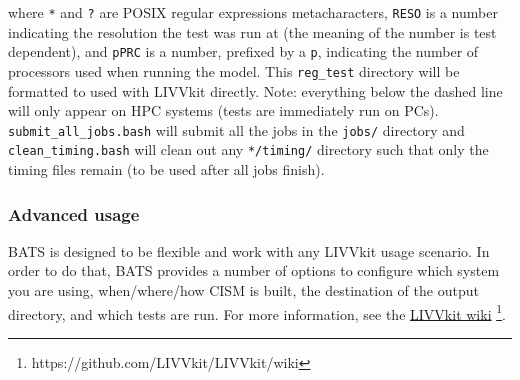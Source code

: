 \noindent
where \texttt{*} and \texttt{?} are POSIX regular expressions metacharacters, \texttt{RESO} is a number indicating the
resolution the test was run at (the meaning of the number is test dependent), and \texttt{pPRC} is a number, prefixed by
a \texttt{p}, indicating the number of processors used when running the model. This \texttt{reg\_test} directory will be
formatted to used with LIVVkit directly. Note: everything below the dashed line will only appear on HPC systems (tests
are immediately run on PCs).  \texttt{submit\_all\_jobs.bash} will submit all the jobs in the \texttt{jobs/} directory
and \texttt{clean\_timing.bash} will clean out any \texttt{*/timing/} directory such that only the timing
files remain (to be used after all jobs finish).

\subsubsection{Advanced usage}
    
BATS is designed to be flexible and work with any LIVVkit usage scenario. In order to do that, BATS provides a number of
options to configure which system you are using, when/where/how CISM is built, the destination of the output directory,
and which tests are run. For more information, see the \href{https://github.com/LIVVkit/LIVVkit/wiki}{LIVVkit wiki}
\footnote{https://github.com/LIVVkit/LIVVkit/wiki}. 



